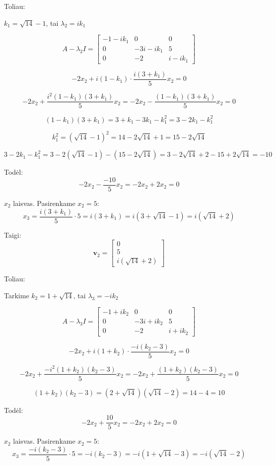 \documentclass{article}
\begin{document}
Toliau:

$k_1 = \sqrt{14} - 1$, tai $\lambda_2 = ik_1$

\[
A - \lambda_2 I = 
\begin{bmatrix}
-1 - ik_1 & 0 & 0 \\
0 & -3i - ik_1 & 5 \\
0 & -2 & i - ik_1
\end{bmatrix}
\]

\[
-2x_2 + i(1 - k_1)\cdot\frac{i(3 + k_1)}{5}x_2 = 0
\]

\[
-2x_2 + \frac{i^2(1 - k_1)(3 + k_1)}{5}x_2 = -2x_2 - \frac{(1 - k_1)(3 + k_1)}{5}x_2 = 0
\]

\[
(1 - k_1)(3 + k_1)= 3 + k_1 - 3k_1 - k_1^2 = 3 - 2k_1 - k_1^2
\]

\[
k_1^2 = (\sqrt{14} - 1)^2 = 14 - 2\sqrt{14} + 1 = 15 - 2\sqrt{14}
\]

\[
3 - 2k_1 - k_1^2 = 3 - 2(\sqrt{14} - 1) - (15 - 2\sqrt{14}) = 3 - 2\sqrt{14} + 2 - 15 + 2\sqrt{14} = -10
\]

Todėl:
\[
-2x_2 - \frac{-10}{5}x_2 = -2x_2 + 2x_2 = 0
\]

$x_2$ laisvas. Pasirenkame $x_2 = 5$:
\[
x_3 = \frac{i(3 + k_1)}{5} \cdot 5 = i(3 + k_1) = i(3 + \sqrt{14} - 1) = i(\sqrt{14} + 2)
\]

Taigi:
\[
\mathbf{v}_2 = \begin{bmatrix} 0 \\ 5 \\ i(\sqrt{14} + 2) \end{bmatrix}
\]

Toliau:

Tarkime $k_2 = 1 + \sqrt{14}$, tai $\lambda_3 = -ik_2$

\[
A - \lambda_3 I = 
\begin{bmatrix}
-1 + ik_2 & 0 & 0 \\
0 & -3i + ik_2 & 5 \\
0 & -2 & i + ik_2
\end{bmatrix}
\]

\[
-2x_2 + i(1 + k_2)\cdot\frac{-i(k_2 - 3)}{5}x_2 = 0
\]

\[
-2x_2 + \frac{-i^2(1 + k_2)(k_2 - 3)}{5}x_2 = -2x_2 + \frac{(1 + k_2)(k_2 - 3)}{5}x_2 = 0
\]

\[
(1 + k_2)(k_2 - 3) = (2 + \sqrt{14})(\sqrt{14} - 2) = 14 - 4 = 10
\]

Todėl:
\[
-2x_2 + \frac{10}{5}x_2 = -2x_2 + 2x_2 = 0
\]

$x_2$ laisvas. Pasirenkame $x_2 = 5$:
\[
x_3 = \frac{-i(k_2 - 3)}{5} \cdot 5 = -i(k_2 - 3) = -i(1 + \sqrt{14} - 3) = -i(\sqrt{14} - 2)
\]
\end{document}
